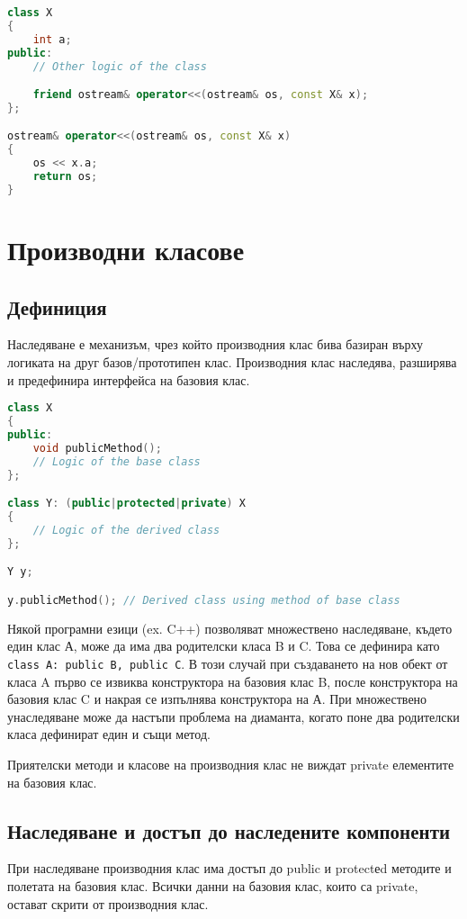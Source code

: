 \documentclass[fleqn,12pt]{article}
\begin{document}
\begin{lstlisting}[language=C++, caption=Example overriding of an operator]
class X
{
    int a;
public:
    // Other logic of the class

    friend ostream& operator<<(ostream& os, const X& x);
};

ostream& operator<<(ostream& os, const X& x)
{
    os << x.a;
    return os;
}
\end{lstlisting}


\section{Производни класове}
\subsection{Дефиниция}
Наследяване е механизъм, чрез който производния клас бива базиран върху логиката на друг базов/прототипен клас. Производния клас наследява, разширява и предефинира интерфейса на базовия клас. 

\begin{lstlisting}[language=C++, caption=Example inheritence]
class X
{
public:
    void publicMethod();
    // Logic of the base class
};

class Y: (public|protected|private) X
{
    // Logic of the derived class
};

Y y;

y.publicMethod(); // Derived class using method of base class

\end{lstlisting}

Някой програмни езици (ex. C++) позволяват множествено наследяване, където един клас А, може да има два родителски класа B и C. Това се дефинира като \texttt{ class A: public B, public C}. В този случай при създаването на нов обект от класа A първо се извиква конструктора на базовия клас B, после конструктора на базовия клас C и накрая се изпълнява конструктора на А.
При множествено унаследяване може да настъпи проблема на диаманта, когато поне два родителски класа дефинират един и същи метод.

Приятелски методи и класове на производния клас не виждат private елементите на базовия клас.

\subsection{Наследяване и достъп до наследените компоненти}
При наследяване производния клас има достъп до public и protectеd методите и полетата на базовия клас. Всички данни на базовия клас, които са private, остават скрити от производния клас. 
\end{document}
